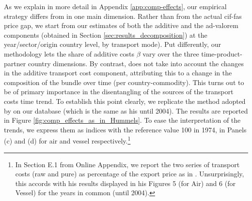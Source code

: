 \documentclass[a4paper,11pt]{article}
\begin{document}
As we explain in more detail in Appendix \ref{app:comp-effects}, our empirical strategy differs from \cite{hummels2007} in one main dimension.
Rather than from the actual cif-fas price gap, we start from our estimates of both the additive and the ad-valorem components (obtained in Section \ref{sec:results_decomposition}) at the year/sector/origin country level, by transport mode). Put differently, our methodology lets the share of additive costs $\beta$ vary over the three time-product-partner country dimensions. By contrast, \cite{hummels2007} does not take into account the changes in the additive transport cost component, attributing this to a change in the composition of the bundle over time (per country-commodity). This turns out to be of primary importance in the disentangling of the sources of the transport costs time trend. To establish this point clearly, we replicate the method adopted by \cite{hummels2007} on our database (which is the same as his until 2004). The results are reported in Figure \ref{fig:comp_effects_as_in_Hummels}. To ease the interpretation of the trends, we express them as indices with the reference value 100 in 1974, in Panels (c) and (d) for air and vessel respectively.\footnote{In Section E.1 from Online Appendix, we report the two series of transport costs (raw and pure) as percentage of the export price as in \cite{hummels2007}. Unsurprisingly, this accords with his results displayed in his Figures 5 (for Air) and 6 (for Vessel) for the years in common (until 2004). }
\end{document}
